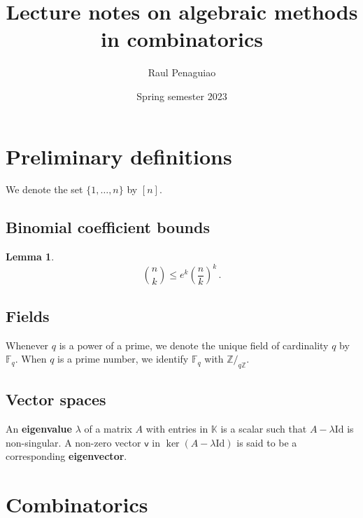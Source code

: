 \documentclass[12pt]{amsart}
\theoremstyle{definition}
\newtheorem{lm}[thm]{Lemma}
\newcommand{\Z}{\mathbb{Z}}
\newcommand{\F}{\mathbb{F}}
\newcommand{\K}{\mathbb{K}}
\newcommand{\vv}{\mathsf{v}}
\newcommand{\Id}{\mathrm{Id}}
\begin{document}
\title{Lecture notes on algebraic methods in combinatorics} %

\author{Raul Penaguiao}
\address{Max Planck Institute for the Sciences Leipzig}
\subjclass[2010]{}
\date{Spring semester 2023} %


\maketitle

\tableofcontents

\section{Preliminary definitions}

We denote the set $\{1, \dots, n\}$ by $[n]$.

\subsection{Binomial coefficient bounds}


\begin{lm}\label{lm:binom_bound}
$$\binom{n}{k} \leq e^k \left( \frac{n}{k} \right)^k \, . $$
\end{lm}

\subsection{Fields}
Whenever $q$ is a power of a prime, we denote the unique field of cardinality $q$ by $\F_q$.
When $q$ is a prime number, we identify $\F_q$ with $\Z/_{q\Z}$.


\subsection{Vector spaces}

An \textbf{eigenvalue} $\lambda$ of a matrix $A$ with entries in $\K$ is a scalar such that $A - \lambda \Id $ is non-singular.
A non-zero vector $\vv $ in $\ker (A - \lambda \Id)  $ is said to be a corresponding \textbf{eigenvector}.

\section{Combinatorics}
\end{document}
